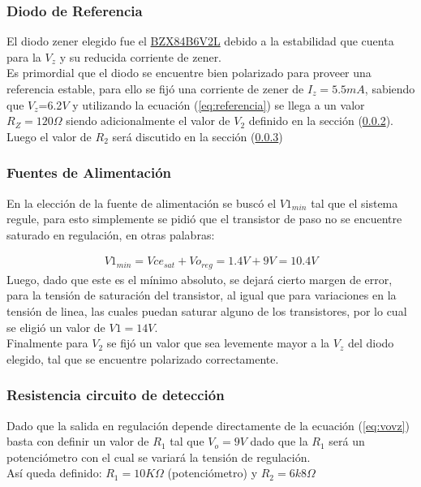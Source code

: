 \subsubsection{Diodo de Referencia}
El diodo zener elegido fue el \href{https://d1d2qsbl8m0m72.cloudfront.net/en/products/databook/datasheet/discrete/diode/zener/bzx84b6v2lt116-e.pdf}{BZX84B6V2L}
debido a la estabilidad que cuenta para la $V_z$ y su reducida corriente de zener.\\
Es primordial que el diodo se encuentre bien polarizado para proveer una referencia estable, para ello se fijó una corriente de zener de $I_z =5.5mA$, sabiendo que $V_z$=6.2$V$  y utilizando la ecuación (\ref{eq:referencia}) se llega a un valor $R_Z=120\Omega$ siendo adicionalmente el valor de $V_2$ definido en la sección (\ref{sec:fuentes}).
Luego el valor de $R_2$ será discutido en la sección (\ref{sec:resdet})
\subsubsection{Fuentes de Alimentación}
\label{sec:fuentes}
En la elección de la fuente de alimentación se buscó el $V1_{min}$ tal que el sistema regule, para esto simplemente se pidió que el transistor de paso no se encuentre saturado en regulación, en otras palabras:

\begin{align}
V1_{min}=Vce_{sat}+Vo_{reg}= 1.4V+9V=10.4V
\end{align}
Luego, dado que este es el mínimo absoluto, se dejará cierto margen de error, para la tensión de saturación del transistor, al igual que para variaciones en la tensión de linea, las cuales puedan saturar alguno de los transistores, por lo cual se eligió un valor de $V1=14V$.\\
Finalmente para $V_2$ se fijó un valor que sea levemente mayor a la $V_z$ del diodo elegido, tal que se encuentre polarizado correctamente.

\subsubsection{Resistencia circuito de detección}
\label{sec:resdet}
Dado que la salida en regulación depende directamente de la ecuación (\ref{eq:vovz}) basta con definir un valor de $R_1$ tal que $V_o=9V$ dado que la $R_1$ será un potenciómetro con el cual se variará la tensión de regulación.\\ Así queda definido: $R_1= 10K \Omega$ (potenciómetro) y $R_2=6k8\Omega$
